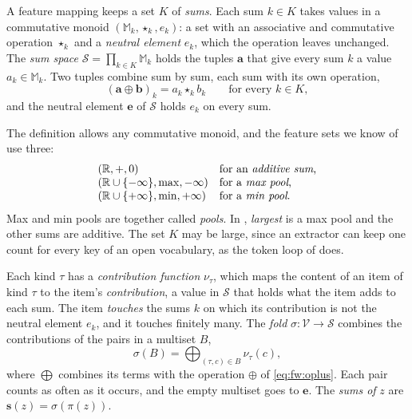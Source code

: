 \label{def:fw:sums}
{
A feature mapping keeps a set $K$ of \emph{sums}. Each sum $k \in K$ takes values in a commutative monoid
$(\mathbb{M}_k, \star_k, e_k)$: a set with an associative and commutative operation $\star_k$ and a \emph{neutral
element} $e_k$, which the operation leaves unchanged. The \emph{sum space} $\mathcal{S} = \prod_{k \in K}
\mathbb{M}_k$ holds the tuples $\mathbf{a}$ that give every sum $k$ a value $a_k \in \mathbb{M}_k$. Two tuples combine
sum by sum, each sum with its own operation,
\begin{equation}
  \label{eq:fw:oplus}
  (\mathbf{a} \oplus \mathbf{b})_k = a_k \star_k b_k \qquad \text{for every } k \in K,
\end{equation}
and the neutral element $\mathbf{e}$ of $\mathcal{S}$ holds $e_k$ on every sum.
}

\noindent The definition allows any commutative monoid, and the feature sets we know of use three:
\begin{equation}
  \label{eq:fw:monoids}
  \begin{array}{@{}ll@{}}
    (\mathbb{R}, +, 0) & \text{for an \emph{additive sum},} \\
    (\mathbb{R} \cup \{-\infty\}, \max, -\infty) & \text{for a \emph{max pool},} \\
    (\mathbb{R} \cup \{+\infty\}, \min, +\infty) & \text{for a \emph{min pool}.}
  \end{array}
\end{equation}
Max and min pools are together called \emph{pools}. In , \textit{largest} is a max pool and
the other sums are additive. The set $K$ may be large,
since an extractor can keep one count for every key of an open vocabulary, as the token loop of
 does.

\label{def:fw:contributions}
{
Each kind $\tau$ has a \emph{contribution function} $\nu_\tau$, which maps the content of an item of kind $\tau$ to
the item's \emph{contribution}, a value in $\mathcal{S}$ that holds what the item adds to each sum. The item
\emph{touches} the sums $k$ on which its contribution is not the neutral element $e_k$, and it touches finitely many. The \emph{fold}
$\sigma: \mathcal{V} \to \mathcal{S}$ combines the contributions of the pairs in a multiset $B$,
\begin{equation}
  \label{eq:fw:fold}
  \sigma(B) = \bigoplus_{(\tau, c) \in B} \nu_\tau(c),
\end{equation}
where $\bigoplus$ combines its terms with the operation $\oplus$ of \eqref{eq:fw:oplus}. Each pair counts as often as
it occurs, and the empty multiset goes to $\mathbf{e}$. The \emph{sums of} $z$ are $\mathbf{s}(z) = \sigma(\pi(z))$.
}


